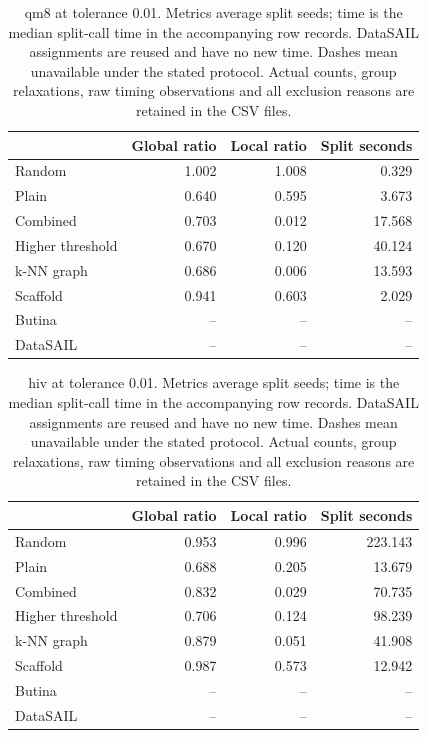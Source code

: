 \begin{table}[htbp]\centering\small
\begin{tabular}{lrrr}
\toprule
 & Global ratio & Local ratio & Split seconds \\
\midrule
Random & 1.002 & 1.008 & 0.329 \\
Plain & 0.640 & 0.595 & 3.673 \\
Combined & 0.703 & 0.012 & 17.568 \\
Higher threshold & 0.670 & 0.120 & 40.124 \\
k-NN graph & 0.686 & 0.006 & 13.593 \\
Scaffold & 0.941 & 0.603 & 2.029 \\
Butina & -- & -- & -- \\
DataSAIL & -- & -- & -- \\
\bottomrule
\end{tabular}

\caption{qm8 at tolerance 0.01. Metrics average split seeds; time is the median split-call time in the accompanying row records. DataSAIL assignments are reused and have no new time. Dashes mean unavailable under the stated protocol. Actual counts, group relaxations, raw timing observations and all exclusion reasons are retained in the CSV files.}\end{table}
\begin{table}[htbp]\centering\small
\begin{tabular}{lrrr}
\toprule
 & Global ratio & Local ratio & Split seconds \\
\midrule
Random & 0.953 & 0.996 & 223.143 \\
Plain & 0.688 & 0.205 & 13.679 \\
Combined & 0.832 & 0.029 & 70.735 \\
Higher threshold & 0.706 & 0.124 & 98.239 \\
k-NN graph & 0.879 & 0.051 & 41.908 \\
Scaffold & 0.987 & 0.573 & 12.942 \\
Butina & -- & -- & -- \\
DataSAIL & -- & -- & -- \\
\bottomrule
\end{tabular}

\caption{hiv at tolerance 0.01. Metrics average split seeds; time is the median split-call time in the accompanying row records. DataSAIL assignments are reused and have no new time. Dashes mean unavailable under the stated protocol. Actual counts, group relaxations, raw timing observations and all exclusion reasons are retained in the CSV files.}\end{table}
